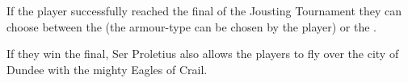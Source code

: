 {\entryfont\noindent If the player successfully reached the final of the Jousting Tournament they can choose between the \hyperref[mi:CastOffArmour]{} (the armour-type can be chosen by the player) or the \hyperref[mi:ShieldOfExpression]{}.

If they win the final, Ser Proletius also allows the players to fly over the city of Dundee with the mighty Eagles of Crail.}





